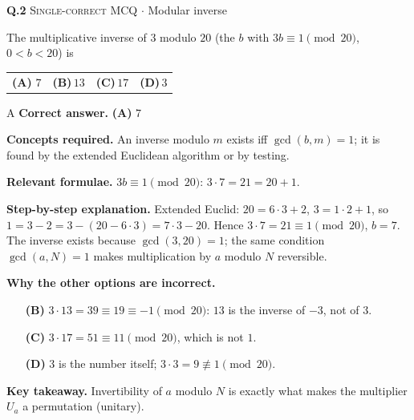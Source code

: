 \documentclass[11pt,a4paper]{article}
\newcommand{\optlabel}[1]{\textbf{(#1)}}
\newcommand{\correctlabel}[1]{\textcolor{okgreen}{\textbf{(#1)}\,\ding{51}}}
\newenvironment{qitem}[1]{\begin{list}{}{\setlength{\leftmargin}{3.3em}\setlength{\labelwidth}{3.1em}%
  \setlength{\labelsep}{0.2em}\setlength{\topsep}{3pt}\setlength{\parsep}{3pt}}\item[\textbf{Q.#1}\hfill]}{\end{list}}
\newcommand{\qsep}{\par\vspace{2pt}{\color{black!15}\hrule}\vspace{4pt}}
\newcommand{\qmeta}[2]{{\footnotesize\color{black!60}\textsc{#1} \;$\cdot$\; #2}\par}
\begin{document}
\begin{qitem}{2}
\qmeta{Single-correct MCQ}{Modular inverse}
The multiplicative inverse of $3$ modulo $20$ (the $b$ with $3b \equiv 1 \pmod{20}$, $0 < b < 20$) is
\par\smallskip\noindent\begin{tabularx}{\linewidth}{@{}*{4}{L}@{}}
\correctlabel{A}\,$7$ & \optlabel{B}\,$13$ & \optlabel{C}\,$17$ & \optlabel{D}\,$3$
\end{tabularx}
\end{qitem}
\begin{solbox}{A}
\textbf{\color{brand}Correct answer.} \textcolor{okgreen}{\textbf{(A)}} $7$

\textbf{\color{brand}Concepts required.} An inverse modulo $m$ exists iff $\gcd(b, m) = 1$; it is found by the extended Euclidean algorithm or by testing.

\textbf{\color{brand}Relevant formulae.} $3b \equiv 1 \pmod{20}$: $3\cdot7 = 21 = 20 + 1$.

\textbf{\color{brand}Step-by-step explanation.} Extended Euclid: $20 = 6\cdot3 + 2$, $3 = 1\cdot2 + 1$, so $1 = 3 - 2 = 3 - (20 - 6\cdot3) = 7\cdot3 - 20$. Hence $3\cdot7 = 21 \equiv 1 \pmod{20}$,
$b = 7$. The inverse exists because $\gcd(3, 20) = 1$; the same condition $\gcd(a, N) = 1$ makes multiplication by $a$ modulo $N$ reversible.

\textbf{\color{brand}Why the other options are incorrect.}
\begin{itemize}[leftmargin=2.4em, itemsep=1pt, topsep=2pt]
\item[\textbf{(B)}] $3\cdot13 = 39 \equiv 19 \equiv -1 \pmod{20}$: $13$ is the inverse of $-3$, not of $3$.
\item[\textbf{(C)}] $3\cdot17 = 51 \equiv 11 \pmod{20}$, which is not $1$.
\item[\textbf{(D)}] $3$ is the number itself; $3\cdot3 = 9 \not\equiv 1 \pmod{20}$.
\end{itemize}
\textbf{\color{brand}Key takeaway.} Invertibility of $a$ modulo $N$ is exactly what makes the multiplier $U_a$ a permutation (unitary).
\end{solbox}
\qsep
\end{document}
